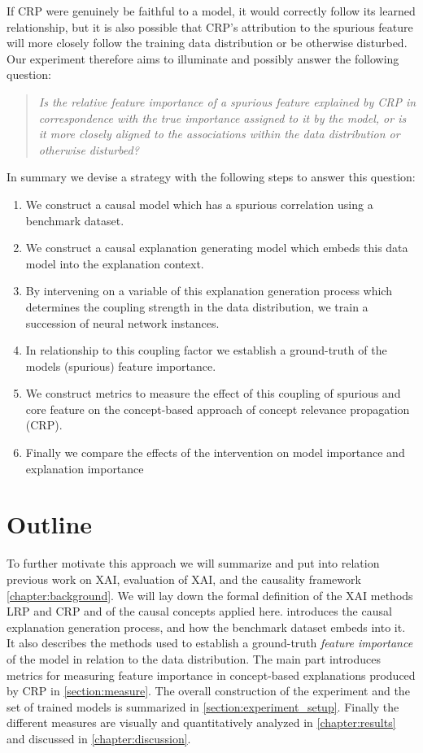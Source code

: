 If CRP were genuinely be faithful to a model, it would correctly follow its learned relationship, but it is also possible that CRP's attribution to the spurious feature will more closely follow the training data distribution or be otherwise disturbed. Our experiment therefore aims to illuminate and possibly answer the following question: 

\begin{quote}
\textit{Is the relative feature importance of a spurious feature explained by CRP in correspondence with the true importance assigned to it by the model, or is it more closely aligned to the associations within the data distribution or otherwise disturbed?}
\end{quote} 

\filbreak
In summary we devise a strategy with the following steps to answer this question:
\begin{enumerate}
    \item We construct a causal model which has a spurious correlation using a benchmark dataset.
    \item We construct a causal explanation generating model which embeds this data model into the explanation context.
    \item By intervening on a variable of this explanation generation process which determines the coupling strength in the data distribution, we train a succession of neural network instances.
    \item In relationship to this coupling factor we establish a ground-truth of the models (spurious) feature importance.
    \item We construct metrics to measure the effect of this coupling of spurious and core feature on the concept-based approach of concept relevance propagation (CRP).
    \item Finally we compare the effects of the intervention on model importance and explanation importance
\end{enumerate}
\filbreak

\section{Outline}
To further motivate this approach we will summarize and put into relation previous work on XAI, evaluation of XAI, and the causality framework \cref{chapter:background}. We will lay down the formal definition of the XAI methods LRP and CRP and of the causal concepts applied here.
 introduces the causal explanation generation process, and how the benchmark dataset embeds into it. It also describes the methods used to establish a ground-truth \textit{feature importance} of the model in relation to the data distribution. 
The main part introduces metrics for measuring feature importance in concept-based explanations produced by CRP in \cref{section:measure}. The overall construction of the experiment and the set of trained models is summarized in \cref{section:experiment_setup}. Finally the different measures are visually and quantitatively analyzed in \cref{chapter:results} and discussed in \cref{chapter:discussion}.
